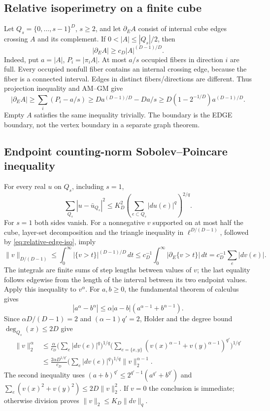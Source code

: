 \subsection{Relative isoperimetry on a finite cube}
Let $Q_s=\{0,\ldots,s-1\}^D$, $s\geq2$, and let $\partial_E A$ consist
of internal cube edges crossing $A$ and its complement. If
$0<|A|\leq |Q_s|/2$, then
\begin{equation}\label{eq:relative-edge-iso}
 |\partial_E A|\geq c_D|A|^{(D-1)/D}.
\end{equation}
Indeed, put $a=|A|$, $P_i=|\pi_i A|$. At most $a/s$ occupied fibers in
direction $i$ are full. Every occupied nonfull fiber contains an internal
crossing edge, because the fiber is a connected interval. Edges in distinct
fibers/directions are different. Thus projection inequality and AM--GM give
\[
 |\partial_E A|\geq\sum_i(P_i-a/s)
 \geq D a^{(D-1)/D}-Da/s
 \geq D(1-2^{-1/D})a^{(D-1)/D}.
\]
Empty $A$ satisfies the same inequality trivially. The boundary is the EDGE
boundary, not the vertex boundary in a separate graph theorem.

\subsection{Endpoint counting-norm Sobolev--Poincare inequality}
For every real $u$ on $Q_s$, including $s=1$,
\begin{equation}\label{eq:self-contained-cube}
 \sum_{Q_s}|u-\bar u_{Q_s}|^2
 \leq K_D^2\left(\sum_{e\subset Q_s}|du(e)|^q\right)^{2/q}.
\end{equation}
For $s=1$ both sides vanish. For a nonnegative $v$ supported on at most
half the cube, layer-set decomposition and the triangle inequality in
$\ell^{D/(D-1)}$, followed by \eqref{eq:relative-edge-iso}, imply
\[
 \|v\|_{D/(D-1)}
 \leq\int_0^\infty|\{v>t\}|^{(D-1)/D}\,dt
 \leq c_D^{-1}\int_0^\infty|\partial_E\{v>t\}|\,dt
 =c_D^{-1}\sum_e|dv(e)|.
\]
The integrals are finite sums of step lengths between values of $v$;
the last equality follows edgewise from the length of the interval
between its two endpoint values. Apply this inequality to $v^\alpha$.
For $a,b\geq0$, the fundamental theorem of calculus gives
\[
 |a^\alpha-b^\alpha|
 \leq\alpha|a-b|(a^{\alpha-1}+b^{\alpha-1}).
\]
Since $\alpha D/(D-1)=2$ and $(\alpha-1)q'=2$, Holder and the degree
bound $\deg_{Q_s}(x)\leq2D$ give
\[
 \begin{split}
 \|v\|_2^\alpha
 &\leq\frac\alpha{c_D}\Big(\sum_e|dv(e)|^q\Big)^{1/q}
 \Big(\sum_{e=\{x,y\}}(v(x)^{\alpha-1}+v(y)^{\alpha-1})^{q'}\Big)^{1/q'}\\
 &\leq\frac{2\alpha D^{1/q'}}{c_D}
 \Big(\sum_e|dv(e)|^q\Big)^{1/q}\|v\|_2^{\alpha-1}.
 \end{split}
\]
The second inequality uses $(a+b)^{q'}\leq2^{q'-1}(a^{q'}+b^{q'})$ and
$\sum_e(v(x)^2+v(y)^2)\leq2D\|v\|_2^2$.
If $v=0$ the conclusion is immediate; otherwise division proves
$\|v\|_2\leq K_D\|dv\|_q$.

